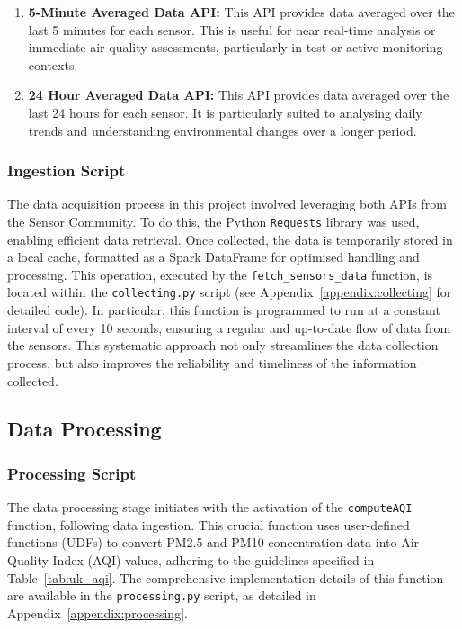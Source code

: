 \documentclass[12pt,oneside]{book} %
\begin{document}
\begin{enumerate}
    \item \textbf{5-Minute Averaged Data API:} This API provides data averaged over the last 5 minutes for each sensor. This is useful for near real-time analysis or immediate air quality assessments, particularly in test or active monitoring contexts.
    \item \textbf{24 Hour Averaged Data API:} This API provides data averaged over the last 24 hours for each sensor. It is particularly suited to analysing daily trends and understanding environmental changes over a longer period.
\end{enumerate}

\subsubsection{Ingestion Script}
The data acquisition process in this project involved leveraging both APIs from
the Sensor Community. To do this, the Python \texttt{Requests} library was
used, enabling efficient data retrieval. Once collected, the data is
temporarily stored in a local cache, formatted as a Spark DataFrame for
optimised handling and processing. This operation, executed by the
\texttt{fetch\_sensors\_data} function, is located within the
\texttt{collecting.py} script (see Appendix~\ref{appendix:collecting} for
detailed code). In particular, this function is programmed to run at a constant
interval of every 10 seconds, ensuring a regular and up-to-date flow of data
from the sensors. This systematic approach not only streamlines the data
collection process, but also improves the reliability and timeliness of the
information collected.

\subsection{Data Processing}

\subsubsection{Processing Script}
The data processing stage initiates with the activation of the
\texttt{computeAQI} function, following data ingestion. This crucial function
uses user-defined functions (UDFs) to convert PM2.5 and PM10 concentration data
into Air Quality Index (AQI) values, adhering to the guidelines specified in
Table~\ref{tab:uk_aqi}. The comprehensive implementation details of this
function are available in the \texttt{processing.py} script, as detailed in
Appendix~\ref{appendix:processing}.
\end{document}

